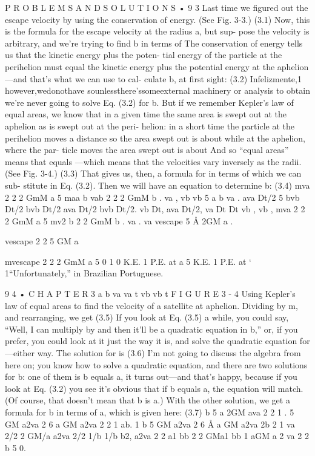 \documentclass[10pt,oneside]{article}
\begin{document}
P R O B L E M S  A N D  S O L U T I O N S • 9 3 Last time we figured out the escape velocity by using the conservation of energy. (See Fig. 3-3.) (3.1) Now, this is the formula for the escape velocity at the radius a, but sup- pose the velocity is arbitrary, and we’re trying to find b in terms of The conservation of energy tells us that the kinetic energy plus the poten- tial energy of the particle at the perihelion must equal the kinetic energy plus the potential energy at the aphelion---and that’s what we can use to cal- culate b, at first sight: (3.2) Infelizmente,1 however,wedonothave sounlessthere’ssomeexternal machinery or analysis to obtain we’re never going to solve Eq. (3.2) for b. But if we remember Kepler’s law of equal areas, we know that in a given time the same area is swept out at the aphelion as is swept out at the peri- helion: in a short time the particle at the perihelion moves a distance so the area swept out is about while at the aphelion, where the par- ticle moves the area swept out is about And so “equal areas” means that equals ---which means that the velocities vary inversely as the radii. (See Fig. 3-4.) (3.3) That gives us, then, a formula for in terms of which we can sub- stitute in Eq. (3.2). Then we will have an equation to determine b: (3.4) mva 2 2 2 GmM a 5 maa b vab 2 2 2 GmM b . va , vb vb 5 a b va . ava Dt/2 5 bvb Dt/2 bvb Dt/2 ava Dt/2 bvb Dt/2. vb Dt, ava Dt/2, va Dt Dt vb , vb , mva 2 2 2 GmM a 5 mv2 b 2 2 GmM b . va . va vescape 5 Å 2GM a .\par

vescape 2 2 5 GM a\par

mvescape 2 2 2 GmM a 5 0 1 0 K.E. 1 P.E. at a 5 K.E. 1 P.E. at ` 1“Unfortunately,” in Brazilian Portuguese.\par

9 4 • C H A P T E R  3 a b va va t vb vb t F I G U R E  3 - 4 Using Kepler’s law of equal areas to find the velocity of a satellite at aphelion. Dividing by m, and rearranging, we get (3.5) If you look at Eq. (3.5) a while, you could say, “Well, I can multiply by and then it’ll be a quadratic equation in b,” or, if you prefer, you could look at it just the way it is, and solve the quadratic equation for ---either way. The solution for is (3.6) I’m not going to discuss the algebra from here on; you know how to solve a quadratic equation, and there are two solutions for b: one of them is b equals a, it turns out---and that’s happy, because if you look at Eq. (3.2) you see it’s obvious that if b equals a, the equation will match. (Of course, that doesn’t mean that b is a.) With the other solution, we get a formula for b in terms of a, which is given here: (3.7) b 5 a 2GM ava 2 2 1 . 5 GM a2va 2 6 a GM a2va 2 2 1 ab. 1 b 5 GM a2va 2 6 Å a GM a2va 2b 2 1 va 2/2 2 GM/a a2va 2/2 1/b 1/b b2, a2va 2 2 a1 bb 2 2 GMa1 bb 1 aGM a 2 va 2 2 b 5 0.\par
\end{document}
